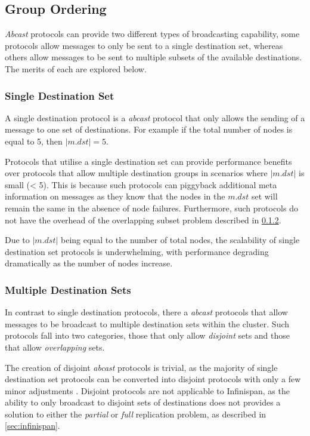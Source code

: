     \subsection{Group Ordering}
    \emph{Abcast} protocols can provide two different types of broadcasting capability, some protocols allow messages to only be sent to a single destination set, whereas others allow messages to be sent to multiple subsets of the available destinations.  The merits of each are explored below.   
    
        \subsubsection{Single Destination Set}
        A single destination protocol is a \emph{abcast} protocol that only allows the sending of a message to one set of destinations.  For example if the total number of nodes is equal to 5, then $\left\vert{m.dst}\right\vert = 5$.
        
        Protocols that utilise a single destination set can provide performance benefits over protocols that allow multiple destination groups in scenarios where $\left\vert{m.dst}\right\vert$ is small (< 5).  This is because such protocols can piggyback additional meta information on messages as they know that the nodes in the $m.dst$ set will remain the same in the absence of node failures.  Furthermore, such protocols do not have the overhead of the overlapping subset problem described in \ref{ssec:overlapping}.  
        
        Due to $\left\vert{m.dst}\right\vert$ being equal to the number of total nodes, the scalability of single destination set protocols is underwhelming, with performance degrading dramatically as the number of nodes increase.  
        
        \subsubsection{Multiple Destination Sets}\label{ssec:overlapping}
        In contrast to single destination protocols, there a \emph{abcast} protocols that allow messages to be broadcast to multiple destination sets within the cluster.  Such protocols fall into two categories, those that only allow \emph{disjoint} sets and those that allow \emph{overlapping} sets.  
        
        The creation of disjoint \emph{abcast} protocols is trivial, as the majority of single destination set protocols can be converted into disjoint protocols with only a few minor adjustments \cite{Defago:2004:TOB:1041680.1041682}.  Disjoint protocols are not applicable to Infinispan, as the ability to only broadcast to disjoint sets of destinations does not provides a solution to either the \emph{partial} or \emph{full} replication problem, as described in \ref{sec:infinispan}.  
        
